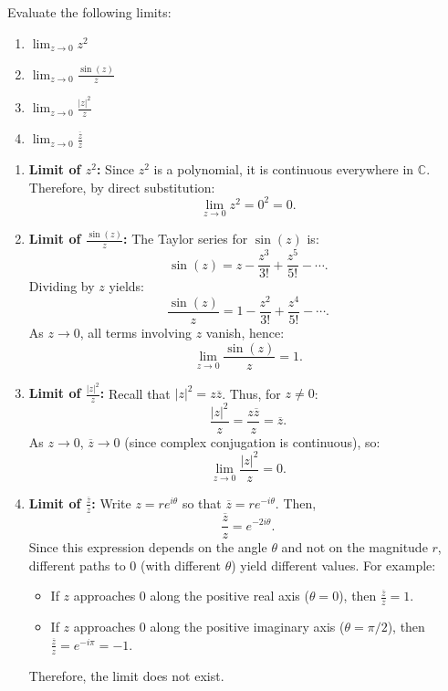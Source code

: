 \exampleline
\begin{example}
Evaluate the following limits:
\begin{enumerate}
    \item \( \displaystyle \lim_{z \to 0} z^2 \)
    \item \( \displaystyle \lim_{z \to 0} \frac{\sin(z)}{z} \)
    \item \( \displaystyle \lim_{z \to 0} \frac{|z|^2}{z} \)
    \item \( \displaystyle \lim_{z \to 0} \frac{\overline{z}}{z} \)
\end{enumerate}

\begin{solution}
\begin{enumerate}
    \item \textbf{Limit of \(z^2\):}  
    Since \(z^2\) is a polynomial, it is continuous everywhere in \(\mathbb{C}\). Therefore, by direct substitution:
    \[
    \lim_{z \to 0} z^2 = 0^2 = 0.
    \]

    \item \textbf{Limit of \(\frac{\sin(z)}{z}\):}  
    The Taylor series for \(\sin(z)\) is:
    \[
    \sin(z) = z - \frac{z^3}{3!} + \frac{z^5}{5!} - \cdots.
    \]
    Dividing by \(z\) yields:
    \[
    \frac{\sin(z)}{z} = 1 - \frac{z^2}{3!} + \frac{z^4}{5!} - \cdots.
    \]
    As \(z \to 0\), all terms involving \(z\) vanish, hence:
    \[
    \lim_{z \to 0} \frac{\sin(z)}{z} = 1.
    \]

    \item \textbf{Limit of \(\frac{|z|^2}{z}\):}  
    Recall that \(|z|^2 = z \overline{z}\). Thus, for \(z \neq 0\):
    \[
    \frac{|z|^2}{z} = \frac{z\overline{z}}{z} = \overline{z}.
    \]
    As \(z \to 0\), \(\overline{z} \to 0\) (since complex conjugation is continuous), so:
    \[
    \lim_{z \to 0} \frac{|z|^2}{z} = 0.
    \]

    \item \textbf{Limit of \(\frac{\overline{z}}{z}\):}  
    Write \(z = re^{i\theta}\) so that \(\overline{z} = re^{-i\theta}\). Then,
    \[
    \frac{\overline{z}}{z} = e^{-2i\theta}.
    \]
    Since this expression depends on the angle \(\theta\) and not on the magnitude \(r\), different paths to 0 (with different \(\theta\)) yield different values. For example:
    \begin{itemize}
        \item If \(z\) approaches 0 along the positive real axis (\(\theta=0\)), then \(\frac{\overline{z}}{z} = 1\).
        \item If \(z\) approaches 0 along the positive imaginary axis (\(\theta=\pi/2\)), then \(\frac{\overline{z}}{z} = e^{-i\pi} = -1\).
    \end{itemize}
    Therefore, the limit does not exist.
\end{enumerate}
\end{solution}
\end{example}
\exampleline

